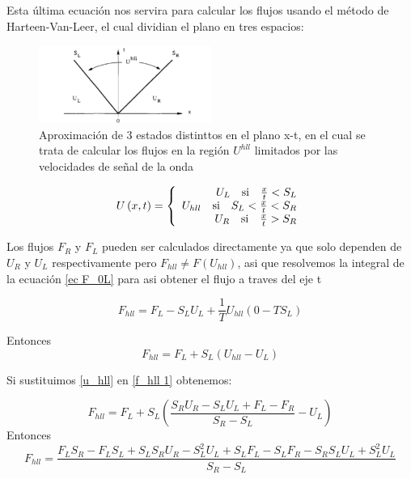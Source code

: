 \documentclass[12pt,a4paper]{book}
\begin{document}
Esta última ecuación nos servira para calcular los flujos usando el método de Harteen-Van-Leer, el cual dividian el plano en tres espacios:

\begin{figure} %
  \centering
    \includegraphics[width=0.5\textwidth]{Figuras/HLL.png}
  \caption{Aproximación de 3 estados distinttos en el plano x-t, en el cual se trata de calcular los flujos en la región $U^{hll}$ limitados por las velocidades de señal de la onda}
  \label{fig:HLL}
\end{figure}

\begin{equation}
U \left(x,t \right) = 
\left\lbrace
\begin{array}{rr}
U_L \quad \textup{si} \quad \frac{x}{t}< S_L  \\
U_{hll} \quad \textup{si} \quad S_L< \frac{x}{t} <S_R \\
U_R \quad \textup{si} \quad  \frac{x}{t} > S_R
\end{array}
\right.
\end{equation}

Los flujos $F_R$ y $F_L$ pueden ser calculados directamente ya que solo dependen de $U_R$ y $U_L$ respectivamente pero $F_{hll} \neq F \left( U_{hll} \right)$, asi que resolvemos la integral de la ecuación \ref{ec F_0L} para asi obtener el flujo a traves del eje t

\begin{equation*}
F_{hll} = F_L -S_L U_L+ \frac{1}{T}U_{hll}\left(0- TS_L\right)
\end{equation*}

Entonces
\begin{equation}\label{f_hll 1}
F_{hll} = F_L +S_L \left( U_{hll} -U_L \right)
\end{equation}

Si sustituimos \ref{u_hll} en \ref{f_hll 1} obtenemos:

\begin{equation*}
F_{hll} = F_L +S_L \left( \frac{S_R U_R - S_L U_L + F_L - F_R}{S_R - S_L} -U_L \right)
\end{equation*}
Entonces
\begin{equation*}
F_{hll} = \frac{F_L S_R -F_L S_L+S_L S_R U_R-S_L^2 U_L+S_L  F_L- S_L F_R-S_R S_L U_L + S_L^2 U_L}{S_R-S_L}
\end{equation*}
\end{document}

